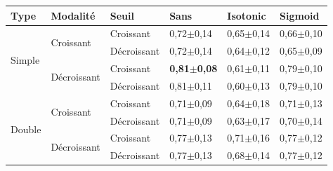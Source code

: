 \begin{table}[H]
    \begin{tabular}{llllll}
        \toprule 
        Type                    & Modalité                          & Seuil             & Sans                  & Isotonic              & Sigmoid               \\ \midrule
        \multirow{4}{*}{Simple} & \multirow{2}{*}{Croissant}        & Croissant         & 0,72$\pm$0,14         & 0,65$\pm$0,14         & 0,66$\pm$0,10         \\ \cline{3-6}
                                &                                   & Décroissant       & 0,72$\pm$0,14         & 0,64$\pm$0,12         & 0,65$\pm$0,09         \\ \cline{2-6}
                                & \multirow{2}{*}{Décroissant}      & Croissant         & \textbf{0,81$\pm$0,08}& 0,61$\pm$0,11         & 0,79$\pm$0,10         \\ \cline{3-6}
                                &                                   & Décroissant       & 0,81$\pm$0,11         & 0,60$\pm$0,13         & 0,79$\pm$0,10         \\ \cline{1-6}
        \multirow{4}{*}{Double} & \multirow{2}{*}{Croissant}        & Croissant         & 0,71$\pm$0,09         & 0,64$\pm$0,18         & 0,71$\pm$0,13         \\ \cline{3-6}
                                &                                   & Décroissant       & 0,71$\pm$0,09         & 0,63$\pm$0,17         & 0,70$\pm$0,14         \\ \cline{2-6}
                                & \multirow{2}{*}{Décroissant}      & Croissant         & 0,77$\pm$0,13         & 0,71$\pm$0,16         & 0,77$\pm$0,12         \\ \cline{3-6}
                                &                                   & Décroissant       & 0,77$\pm$0,13         & 0,68$\pm$0,14         & 0,77$\pm$0,12         \\ \bottomrule
    \end{tabular}
\end{table}

